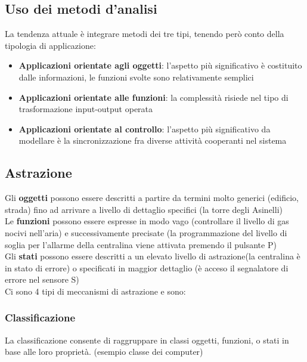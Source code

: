 \documentclass{report}
\begin{document}
            \subsection{Uso dei metodi d'analisi}
                La tendenza attuale è integrare metodi dei tre tipi, tenendo però conto della tipologia di applicazione:
                \begin{itemize}
                    \item \textbf{Applicazioni orientate agli oggetti}: l'aspetto più significativo è costituito dalle informazioni, le funzioni svolte sono relativamente semplici 
                    \item \textbf{Applicazioni orientate alle funzioni}: la complessità risiede nel tipo di trasformazione input-output operata
                    \item \textbf{Applicazioni orientate al controllo}: l'aspetto più significativo da modellare è la sincronizzazione fra diverse attività cooperanti nel sistema
                \end{itemize}
            \subsection{Astrazione}
                Gli \textbf{oggetti} possono essere descritti a partire da termini molto generici (edificio, strada) fino ad arrivare a livello di dettaglio specifici (la torre degli Asinelli)
                \\
                Le \textbf{funzioni} possono essere espresse in modo vago (controllare il livello di gas nocivi nell'aria) e successivamente precisate (la programmazione del livello di soglia per l'allarme della centralina viene attivata premendo il pulsante P)
                \\
                Gli \textbf{stati} possono essere descritti a un elevato livello di astrazione(la centralina è in stato di errore) o specificati in maggior dettaglio (è acceso il segnalatore di errore nel sensore S)
                \\
                Ci sono 4 tipi di meccanismi di astrazione e sono:
                \subsubsection{Classificazione}
                    La classificazione consente di raggruppare in classi oggetti, funzioni, o stati in base alle loro proprietà. (esempio classe dei computer)
\end{document}
